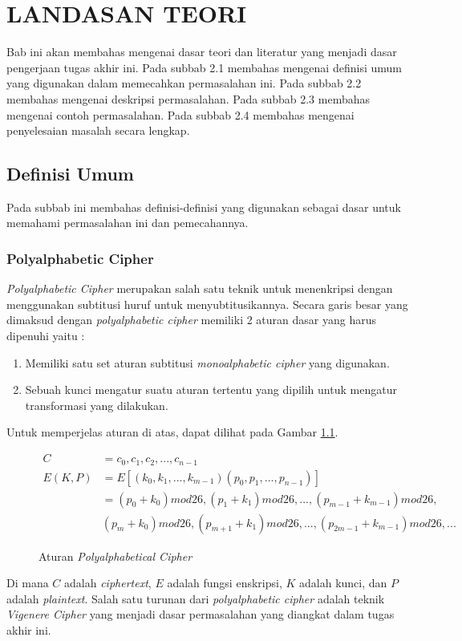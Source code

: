   \renewcommand{\theequation}{\arabic{chapter}.\arabic{equation}}
	\chapter{LANDASAN TEORI}
	Bab ini akan membahas mengenai dasar teori dan literatur yang menjadi dasar pengerjaan tugas akhir ini. Pada subbab 2.1 membahas mengenai definisi umum yang digunakan dalam memecahkan permasalahan ini. Pada subbab 2.2 membahas mengenai deskripsi permasalahan. Pada subbab 2.3 membahas mengenai contoh permasalahan. Pada subbab 2.4 membahas mengenai penyelesaian masalah secara lengkap.
	\section{Definisi Umum}
	Pada subbab ini membahas definisi-definisi yang digunakan sebagai dasar untuk memahami permasalahan ini dan pemecahannya.	
	\subsection{Polyalphabetic Cipher}
	\textit{Polyalphabetic Cipher }merupakan salah satu teknik untuk menenkripsi dengan menggunakan subtitusi huruf untuk menyubtitusikannya. Secara garis besar yang dimaksud dengan \textit{polyalphabetic cipher} memiliki 2 aturan dasar yang harus dipenuhi yaitu :
	\begin{enumerate}
		\item Memiliki satu set aturan subtitusi \textit{monoalphabetic cipher} yang digunakan.
		\item Sebuah kunci mengatur suatu aturan tertentu yang dipilih untuk mengatur transformasi yang dilakukan.
	\end{enumerate}
	Untuk memperjelas aturan di atas, dapat dilihat pada Gambar \ref{fig:polyalphabeticalcipher}.
	\begin{figure}[H]
		\centering
		\begin{align*}
 		C &=c_0,c_1,c_2,...,c_{n-1} \\
      	E(K,P)&=E[(k_0,k_1,...,k_{m-1})(p_0,p_1,...,p_{n-1})] \\
      	&=(p_0+k_0)mod26,(p_1+k_1)mod26,...,(p_{m-1}+k_{m-1})mod26, \\
      		&(p_m+k_0)mod26,(p_{m+1}+k_1)mod26,...,(p_{2m-1}+k_{m-1})mod26,...
		\end{align*}		
		
		\caption{Aturan \textit{Polyalphabetical Cipher}}
		\label{fig:polyalphabeticalcipher}
	\end{figure}
	Di mana $C$ adalah \textit{ciphertext}, $E$ adalah fungsi enskripsi, $K$ adalah kunci, dan $P$ adalah \textit{plaintext}.
	Salah satu turunan dari \textit{polyalphabetic cipher} adalah teknik \textit{Vigenere Cipher} yang menjadi dasar permasalahan yang diangkat dalam tugas akhir ini\cite{stallings_computer_2015}.
	
